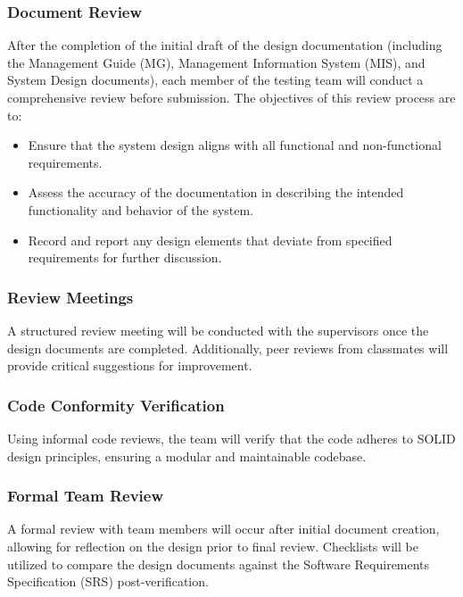 \documentclass[12pt, titlepage]{article}
\begin{document}
\subsubsection{Document Review}
After the completion of the initial draft of the design documentation (including
the Management Guide (MG), Management Information System (MIS), and System
Design documents), each member of the testing team will conduct a comprehensive
review before submission. The objectives of this review process are to:
\begin{itemize}
  \item Ensure that the system design aligns with all functional and
  non-functional requirements.
  \item Assess the accuracy of the documentation in describing the intended
  functionality and behavior of the system.
  \item Record and report any design elements that deviate from specified
  requirements for further discussion.
\end{itemize}

\subsubsection{Review Meetings}
A structured review meeting will be conducted with the supervisors once the
design documents are completed. Additionally, peer reviews from classmates will
provide critical suggestions for improvement.

\subsubsection{Code Conformity Verification}
Using informal code reviews, the team will verify that the code adheres to SOLID
design principles, ensuring a modular and maintainable codebase.

\subsubsection{Formal Team Review}
A formal review with team members will occur after initial document creation,
allowing for reflection on the design prior to final review. Checklists will be
utilized to compare the design documents against the Software Requirements
Specification (SRS) post-verification.
\end{document}
